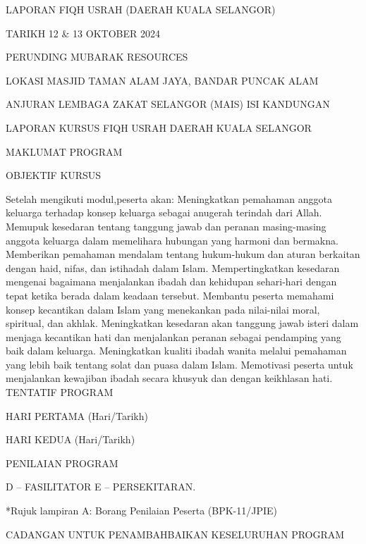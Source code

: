 



LAPORAN FIQH USRAH
(DAERAH KUALA SELANGOR)


TARIKH
12 & 13 OKTOBER 2024


PERUNDING MUBARAK RESOURCES



LOKASI
MASJID TAMAN ALAM JAYA, BANDAR PUNCAK ALAM


ANJURAN
LEMBAGA ZAKAT SELANGOR (MAIS)
ISI KANDUNGAN


LAPORAN KURSUS FIQH USRAH DAERAH KUALA SELANGOR

MAKLUMAT PROGRAM





OBJEKTIF KURSUS



Setelah mengikuti modul,peserta akan:
Meningkatkan pemahaman anggota keluarga terhadap konsep keluarga sebagai anugerah terindah dari Allah.
Memupuk kesedaran tentang tanggung jawab dan peranan masing-masing anggota keluarga dalam memelihara hubungan yang harmoni dan bermakna.
Memberikan pemahaman mendalam tentang hukum-hukum dan aturan berkaitan dengan haid, nifas, dan istihadah dalam Islam.
Mempertingkatkan kesedaran mengenai bagaimana menjalankan ibadah dan kehidupan sehari-hari dengan tepat ketika berada dalam keadaan tersebut.
Membantu peserta memahami konsep kecantikan dalam Islam yang menekankan pada nilai-nilai moral, spiritual, dan akhlak.
Meningkatkan kesedaran akan tanggung jawab isteri dalam menjaga kecantikan hati dan menjalankan peranan sebagai pendamping yang baik dalam keluarga.
Meningkatkan kualiti ibadah wanita melalui pemahaman yang lebih baik tentang solat dan puasa dalam Islam.
Memotivasi peserta untuk menjalankan kewajiban ibadah secara khusyuk dan dengan keikhlasan hati.
TENTATIF PROGRAM


HARI PERTAMA (Hari/Tarikh)












HARI KEDUA (Hari/Tarikh)






PENILAIAN PROGRAM


D – FASILITATOR
E – PERSEKITARAN.


*Rujuk lampiran A: Borang Penilaian Peserta (BPK-11/JPIE)

CADANGAN UNTUK PENAMBAHBAIKAN KESELURUHAN PROGRAM

